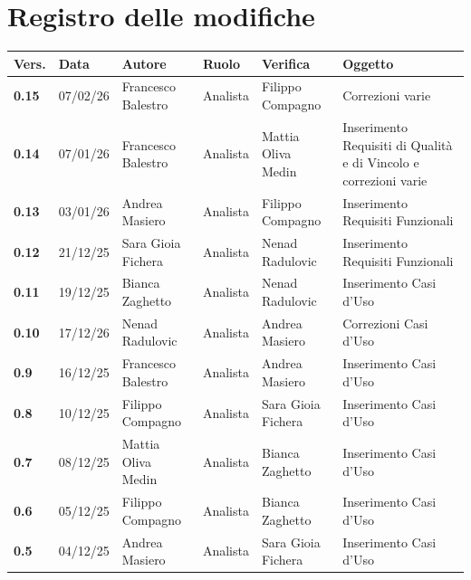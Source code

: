 \documentclass[a4paper,12pt]{article}
\begin{document}
    

    \section*{Registro delle modifiche} {
        \begin{table}[h!]
                \begin{tabularx}{\textwidth}{|l|l|l|l|L|L|}
                \hline
                \textbf{Vers.} & \textbf{Data} & \textbf{Autore} & \textbf{Ruolo} & \textbf{Verifica} & \textbf{Oggetto} \\
                \hline
                \textbf{0.15} & 07/02/26 & Francesco Balestro & Analista & Filippo Compagno & Correzioni varie \\
                \hline
                \textbf{0.14} & 07/01/26 & Francesco Balestro & Analista & Mattia Oliva Medin & Inserimento Requisiti di Qualità e di Vincolo e correzioni varie \\
                \hline
                \textbf{0.13} & 03/01/26 & Andrea Masiero & Analista & Filippo Compagno & Inserimento Requisiti Funzionali \\
                \hline
                \textbf{0.12} & 21/12/25 &  Sara Gioia Fichera & Analista & Nenad Radulovic & Inserimento Requisiti Funzionali \\
                \hline
                \textbf{0.11} & 19/12/25 & Bianca Zaghetto & Analista & Nenad Radulovic & Inserimento Casi d'Uso \\
                \hline
                \textbf{0.10} & 17/12/26 & Nenad Radulovic & Analista & Andrea Masiero & Correzioni Casi d'Uso \\
                \hline
                \textbf{0.9} & 16/12/25 & Francesco Balestro & Analista & Andrea Masiero & Inserimento Casi d'Uso \\
                \hline
                \textbf{0.8} & 10/12/25 & Filippo Compagno & Analista & Sara Gioia Fichera & Inserimento Casi d'Uso \\
                \hline
                \textbf{0.7} & 08/12/25 & Mattia Oliva Medin & Analista & Bianca Zaghetto & Inserimento Casi d'Uso \\
                \hline
                \textbf{0.6} & 05/12/25 & Filippo Compagno & Analista & Bianca Zaghetto & Inserimento Casi d'Uso \\
                \hline
                \textbf{0.5} & 04/12/25 & Andrea Masiero & Analista & Sara Gioia Fichera & Inserimento Casi d'Uso \\

\end{tabularx}
\end{table}}
\end{document}
